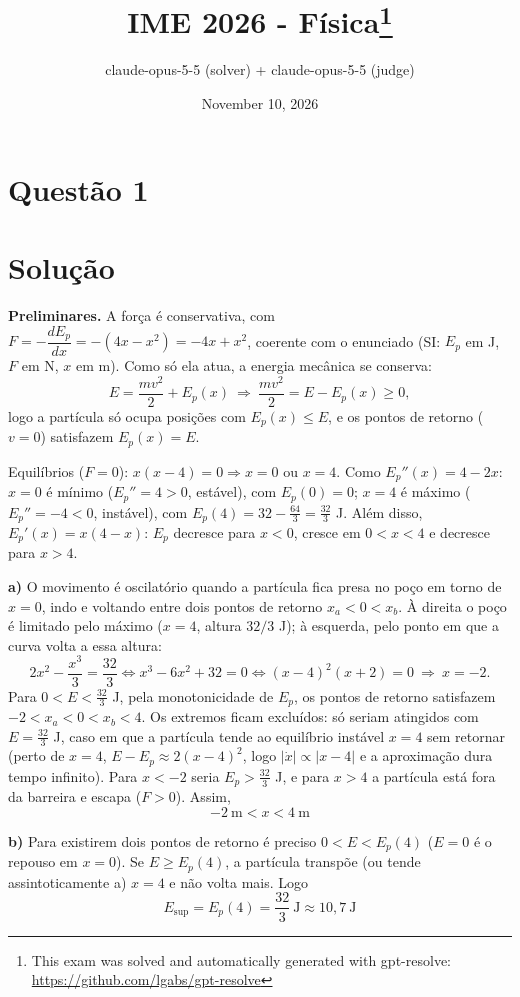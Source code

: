 \documentclass{article}%
\title{IME 2026 - Física\thanks{This exam was solved and automatically generated with gpt-resolve: \url{https://github.com/lgabs/gpt-resolve}}}%
\author{claude{-}opus{-}5{-}5 (solver) + claude{-}opus{-}5{-}5 (judge)}%
\date{November 10, 2026}%
\begin{document}
%
\normalsize%
\maketitle%
\section*{Questão 1}

\section*{Solução}

\textbf{Preliminares.} A força é conservativa, com $F=-\dfrac{dE_p}{dx}=-(4x-x^2)=-4x+x^2$, coerente com o enunciado (SI: $E_p$ em J, $F$ em N, $x$ em m). Como só ela atua, a energia mecânica se conserva:
\[
E=\frac{mv^2}{2}+E_p(x)\ \Longrightarrow\ \frac{mv^2}{2}=E-E_p(x)\ge 0 ,
\]
logo a partícula só ocupa posições com $E_p(x)\le E$, e os pontos de retorno ($v=0$) satisfazem $E_p(x)=E$.

Equilíbrios ($F=0$): $x(x-4)=0\Rightarrow x=0$ ou $x=4$. Como $E_p''(x)=4-2x$:
$x=0$ é mínimo ($E_p''=4>0$, estável), com $E_p(0)=0$; $x=4$ é máximo ($E_p''=-4<0$, instável), com
$E_p(4)=32-\frac{64}{3}=\frac{32}{3}$ J. Além disso, $E_p'(x)=x(4-x)$: $E_p$ decresce para $x<0$, cresce em $0<x<4$ e decresce para $x>4$.

\textbf{a)} O movimento é oscilatório quando a partícula fica presa no poço em torno de $x=0$, indo e voltando entre dois pontos de retorno $x_a<0<x_b$. À direita o poço é limitado pelo máximo ($x=4$, altura $32/3$ J); à esquerda, pelo ponto em que a curva volta a essa altura:
\[
2x^2-\frac{x^3}{3}=\frac{32}{3}\iff x^3-6x^2+32=0\iff (x-4)^2(x+2)=0\ \Longrightarrow\ x=-2 .
\]
Para $0<E<\frac{32}{3}$ J, pela monotonicidade de $E_p$, os pontos de retorno satisfazem $-2<x_a<0<x_b<4$. Os extremos ficam excluídos: só seriam atingidos com $E=\frac{32}{3}$ J, caso em que a partícula tende ao equilíbrio instável $x=4$ sem retornar (perto de $x=4$, $E-E_p\approx 2(x-4)^2$, logo $|\dot x|\propto|x-4|$ e a aproximação dura tempo infinito). Para $x<-2$ seria $E_p>\frac{32}{3}$ J, e para $x>4$ a partícula está fora da barreira e escapa ($F>0$). Assim,
\[
\boxed{-2\ \text{m}<x<4\ \text{m}}
\]

\textbf{b)} Para existirem dois pontos de retorno é preciso $0<E<E_p(4)$ ($E=0$ é o repouso em $x=0$). Se $E\ge E_p(4)$, a partícula transpõe (ou tende assintoticamente a) $x=4$ e não volta mais. Logo
\[
\boxed{E_{\sup}=E_p(4)=\frac{32}{3}\ \text{J}\approx 10{,}7\ \text{J}}
\]
\end{document}
